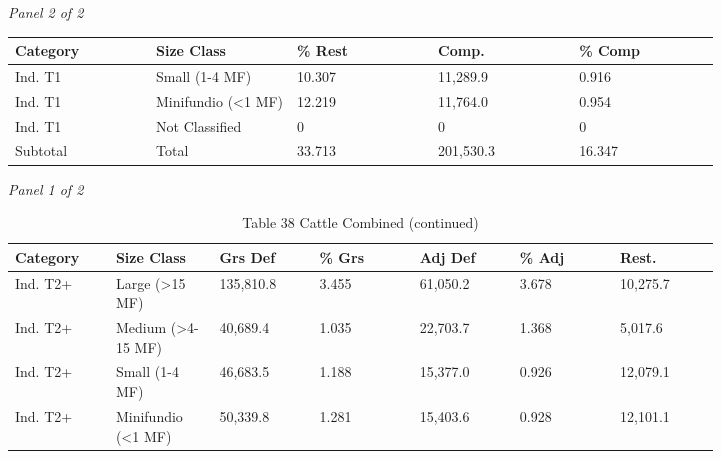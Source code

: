 \documentclass[12pt]{article}
\begin{document}
\begin{landscape}
\begin{table}[H]
\textit{Panel 2 of 2}\\[2pt]
{\fontsize{12}{14}\selectfont
\setlength{\tabcolsep}{3pt}
\renewcommand{\arraystretch}{1.08}
\begin{tabular}{p{0.164\linewidth}p{0.164\linewidth}p{0.164\linewidth}p{0.164\linewidth}p{0.164\linewidth}}
\toprule
Category & Size Class & \% Rest & Comp. & \% Comp \\
\midrule
Ind. T1 & Small (1-4 MF) & 10.307 & 11,289.9 & 0.916 \\
Ind. T1 & Minifundio (<1 MF) & 12.219 & 11,764.0 & 0.954 \\
Ind. T1 & Not Classified & 0 & 0 & 0 \\
Subtotal & Total & 33.713 & 201,530.3 & 16.347 \\
\bottomrule
\end{tabular}
}
\end{table}
\begin{table}[H]
\centering
\caption{Table 38 Cattle Combined (continued)}
\textit{Panel 1 of 2}\\[2pt]
{\fontsize{12}{14}\selectfont
\setlength{\tabcolsep}{3pt}
\renewcommand{\arraystretch}{1.08}
\begin{tabular}{p{0.117\linewidth}p{0.117\linewidth}p{0.117\linewidth}p{0.117\linewidth}p{0.117\linewidth}p{0.117\linewidth}p{0.117\linewidth}}
\toprule
Category & Size Class & Grs Def & \% Grs & Adj Def & \% Adj & Rest. \\
\midrule
Ind. T2+ & Large (>15 MF) & 135,810.8 & 3.455 & 61,050.2 & 3.678 & 10,275.7 \\
Ind. T2+ & Medium (>4-15 MF) & 40,689.4 & 1.035 & 22,703.7 & 1.368 & 5,017.6 \\
Ind. T2+ & Small (1-4 MF) & 46,683.5 & 1.188 & 15,377.0 & 0.926 & 12,079.1 \\
Ind. T2+ & Minifundio (<1 MF) & 50,339.8 & 1.281 & 15,403.6 & 0.928 & 12,101.1 \\
\bottomrule
\end{tabular}
}

\vspace{0.6em}


\end{table}
\end{landscape}
\end{document}
